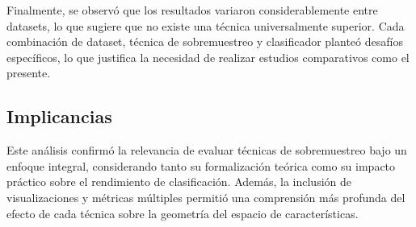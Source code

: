 Finalmente, se observó que los resultados variaron considerablemente entre datasets, lo que sugiere que no existe una técnica universalmente superior. Cada combinación de dataset, técnica de sobremuestreo y clasificador planteó desafíos específicos, lo que justifica la necesidad de realizar estudios comparativos como el presente.

\subsection{Implicancias}

Este análisis confirmó la relevancia de evaluar técnicas de sobremuestreo bajo un enfoque integral, considerando tanto su formalización teórica como su impacto práctico sobre el rendimiento de clasificación. Además, la inclusión de visualizaciones y métricas múltiples permitió una comprensión más profunda del efecto de cada técnica sobre la geometría del espacio de características.
